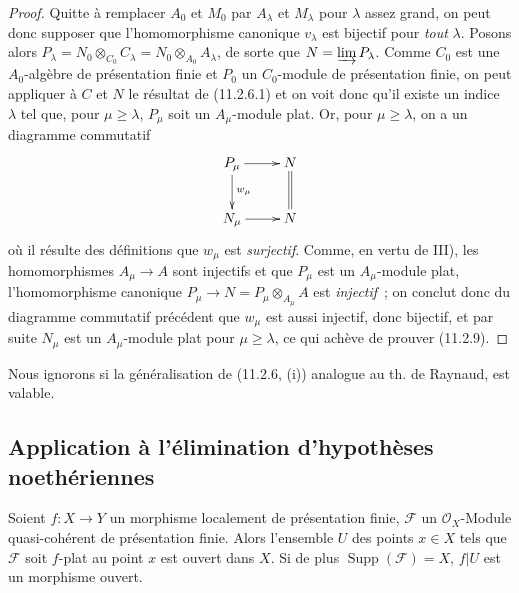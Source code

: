 \begin{proof}
Quitte à remplacer $A_0$ et $M_0$ par $A_\lambda$ et $M_\lambda$ pour
$\lambda$ assez grand, on peut donc supposer que l'homomorphisme canonique
$v_\lambda$ est bijectif pour \emph{tout} $\lambda$. Posons alors
$P_\lambda=N_0\otimes_{C_0}C_\lambda=N_0\otimes_{A_0}A_\lambda$, de sorte que
$N=\varinjlim P_\lambda$. Comme $C_0$ est une $A_0$-algèbre de présentation
finie et $P_0$ un $C_0$-module de présentation finie, on peut appliquer à
$C$ et $N$ le résultat de (11.2.6.1) et on voit donc qu'il existe un indice
$\lambda$ tel que, pour $\mu\geq\lambda$, $P_\mu$ soit un $A_\mu$-module
plat. Or, pour $\mu\geq\lambda$, on a un diagramme commutatif
\[
\xymatrix{
P_\mu \ar[r] \ar[d]^{w_\mu} & N \ar@{=}[d] \\
N_\mu \ar[r] & N
}
\]
où il résulte des définitions que $w_\mu$ est \emph{surjectif}. Comme, en
vertu de III), les homomorphismes $A_\mu\to A$ sont injectifs et que $P_\mu$
est un $A_\mu$-module plat, l'homomorphisme canonique
$P_\mu\to N=P_\mu\otimes_{A_\mu}A$ est \emph{injectif}~; on conclut donc du
diagramme commutatif précédent que $w_\mu$ est aussi injectif, donc bijectif,
et par suite $N_\mu$ est un $A_\mu$-module plat pour $\mu\geq\lambda$, ce qui
achève de prouver (11.2.9).
\end{proof}

\begin{remark}[11.2.10]
\label{IV.11.2.10-fr}
Nous ignorons si la généralisation de (11.2.6, (i)) analogue au th. de Raynaud,
est valable.
\end{remark}

\subsection{Application à l'élimination d'hypothèses noethériennes}
\label{subsection:IV.11.3-fr}
\label{IV.11.3-fr}

\begin{theorem}[11.3.1]
\label{IV.11.3.1-fr}
Soient $f:X\to Y$ un morphisme localement de présentation finie,
$\mathcal F$ un $\mathcal O_X$-Module quasi-cohérent de présentation finie.
Alors l'ensemble $U$ des points $x\in X$ tels que $\mathcal F$ soit $f$-plat
au point $x$ est ouvert dans $X$. Si de plus $\operatorname{Supp}(\mathcal F)=X$,
$f|U$ est un morphisme ouvert.
\end{theorem}

